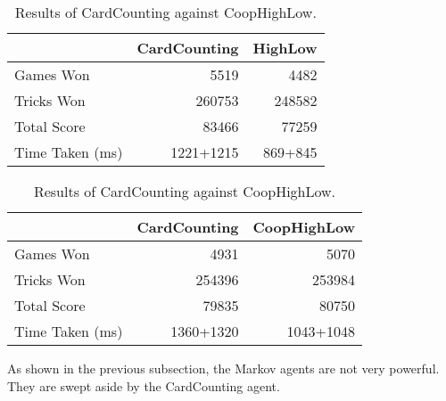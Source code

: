 \begin{table}[ht]
    \begin{minipage}{.525\linewidth}
        \centering
        \begin{tabular}{l|rr}
            ~               &  CardCounting &   HighLow  \\  \hline
            Games Won       &   5519        &   4482   \\
            Tricks Won      &   260753      &   248582 \\
            Total Score     &   83466      &   77259  \\
            Time Taken (ms) &   1221+1215   &   869+845
        \end{tabular}
        \caption{Results of CardCounting against HighLow.}
        \label{tab:cardcounting_highlow}
    \end{minipage}%
    \begin{minipage}{.525\linewidth}
        \centering
        \begin{tabular}{l|rr}
            ~               &  CardCounting &   CoopHighLow  \\  \hline
            Games Won       &   4931        &   5070   \\
            Tricks Won      &   254396      &   253984 \\
            Total Score     &   79835      &   80750  \\
            Time Taken (ms) &   1360+1320   &   1043+1048
        \end{tabular}
        \caption{Results of CardCounting against CoopHighLow.}
        \label{tab:cardcounting_coophighlow}
    \end{minipage} 
\end{table}


As shown in the previous subsection, the Markov agents are not very powerful. They are swept aside by the CardCounting agent.

